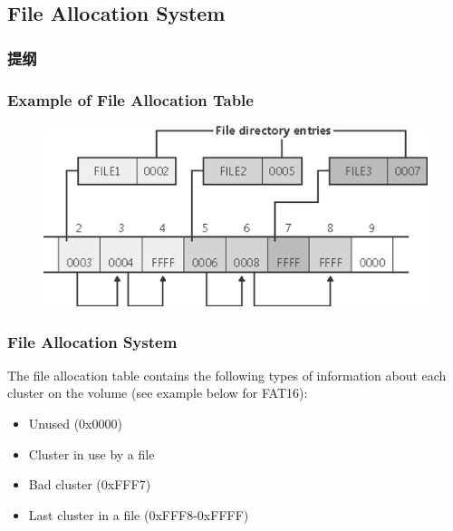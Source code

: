 \subsection{File Allocation System} %
\begin{frame}
\frametitle{提纲} %
\tableofcontents %

\end{frame}
\begin{frame}[fragile]
    \frametitle{Example of File Allocation Table}
    \begin{figure}
  \includegraphics[width=0.9\linewidth]{figs/FAT-example.png}
  \end{figure}
\end{frame}
% 
% 
\begin{frame}[fragile]
    \frametitle{File Allocation System}
    The file allocation table contains the following {\color{red}types} of information about each cluster on the volume (see example below for FAT16):

    \begin{itemize}
        \item Unused (0x0000)
        \item Cluster in use by a file \pause
        \item Bad cluster (0xFFF7)
        \item Last cluster in a file (0xFFF8-0xFFFF)
    \end{itemize}
\end{frame}
